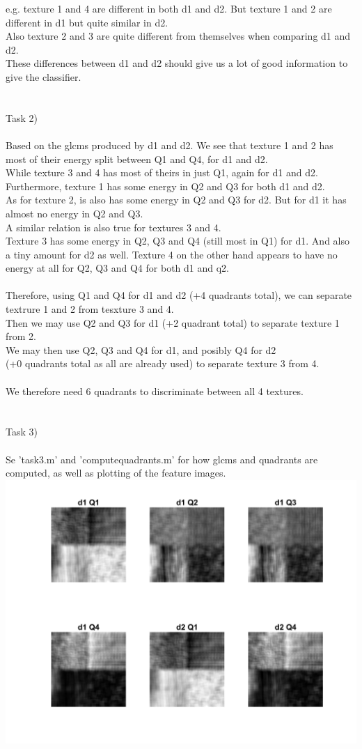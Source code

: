 \documentclass[12pt, letterpaper, twoside]{article}
\begin{document}
e.g. texture 1 and 4 are different in both d1 and d2. But texture 1 and 2 are different in d1 but quite similar in d2.\\
Also texture 2 and 3 are quite different from themselves when comparing d1 and d2.\\
These differences between d1 and d2 should give us a lot of good information to give the classifier.\\
\ \\
\ \\
Task 2)\\
\ \\
Based on the glcms produced by d1 and d2. We see that texture 1 and 2 has most of their energy split between Q1 and Q4, for d1 and d2.\\
While texture 3 and 4 has most of theirs in just Q1, again for d1 and d2.\\
Furthermore, texture 1 has some energy in Q2 and Q3 for both d1 and d2.\\
As for texture 2, is also has some energy in Q2 and Q3 for d2. But for d1 it has almost no energy in Q2 and Q3.\\
A similar relation is also true for textures 3 and 4.\\
Texture 3 has some energy in Q2, Q3 and Q4 (still most in Q1) for d1. And also a tiny amount for d2 as well. Texture 4 on the other hand appears to have no energy at all for Q2, Q3 and Q4 for both d1 and q2.\\
\ \\
Therefore, using Q1 and Q4 for d1 and d2 (+4 quadrants total), we can separate textrure 1 and 2 from tesxture 3 and 4.\\
Then we may use Q2 and Q3 for d1 (+2 quadrant total) to separate texture 1 from 2.\\
We may then use Q2, Q3 and Q4 for d1, and posibly Q4 for d2\\
(+0 quadrants total as all are already used) to separate texture 3 from 4.\\
\ \\
We therefore need 6 quadrants to discriminate between all 4 textures.\\
\ \\
\ \\
Task 3)\\
\ \\
Se 'task3.m' and 'computequadrants.m' for how glcms and quadrants are computed, as well as plotting of the feature images.\\
\includegraphics[scale=0.5]{"task3_quadrants.png"}\\
\end{document}

